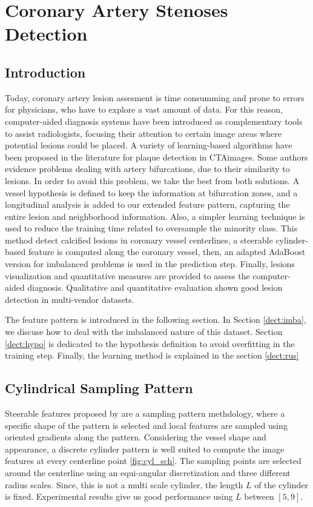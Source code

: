 \chapter{Coronary Artery Stenoses Detection}\label{dect:dect}
%

\section{Introduction}

Today, coronary artery lesion assesment is time consumming and prone to errors for physicians, who have to explore a vast amount of data. For this reason, computer-aided diagnosis systems have been introduced as complementary tools to assist radiologists, focusing their attention to certain image areas where potential lesions could be placed.
A variety of learning-based algorithms have been proposed in the literature for plaque detection in CTAimages. Some authors \citep{Mittal2010, Zuluaga2011c} evidence problems dealing with artery bifurcations, due to their similarity to lesions. In order to avoid this problem, we take the best from both solutions. A vessel hypothesis is defined to keep the information at bifurcation zones, and a longitudinal analysis is added to our extended feature pattern, capturing the entire lesion and neighborhood information. Also, a simpler learning technique is used to reduce the training time related to oversample the minority class.
This method detect calcified lesions in coronary vessel centerlines, a steerable cylinder-based feature is computed along the coronary vessel, then, an adapted AdaBoost version for imbalanced problems \citep{Seiffert2010} is used in the prediction step. Finally, lesions visualization and quantitative measures are provided to assess the computer-aided diagnosis. Qualitative and quantitative evaluation shown good lesion detection in multi-vendor datasets.

The feature pattern is introduced in the following section. In Section \ref{dect:imba}, we discuse how to deal with the imbalanced nature of this dataset. Section \ref{dect:hypo} is dedicated to the hypothesis definition to avoid overfitting in the training step. Finally, the learning method is explained in the section \ref{dect:rus}

\section{Cylindrical Sampling Pattern}

Steerable features proposed by \citep{Zheng2007} are a sampling pattern methdology, where a specific shape of the pattern is selected and local features are sampled using oriented gradients along the pattern. Considering the vessel shape and appearance, a discrete cylinder pattern is well suited to compute the image features at every centerline point \ref{fig:cyl_sch}. The sampling points are selected around the centerline using an equi-angular discretization and three different radius scales. Since, this is not a multi scale cylinder, the length $L$ of the cylinder is fixed. Experimental results give us good performance using $L$ between $\left[5 ,9\right]$. 

